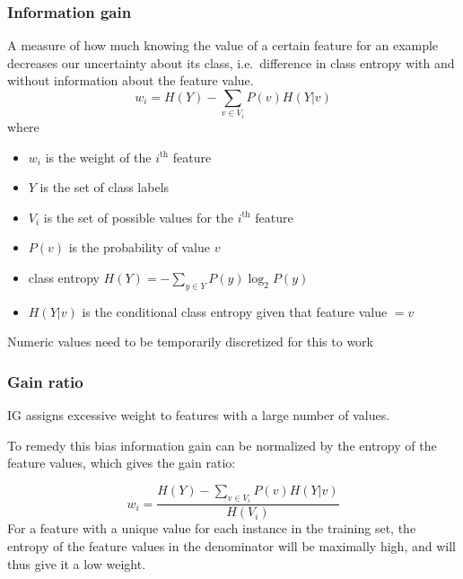 \documentclass{beamer}
\begin{document}
\begin{frame}
 \frametitle{Information gain}
\begin{block}{}
  A measure of how much knowing the value of a certain feature for an
  example decreases our uncertainty about its class, i.e.\ difference
  in class entropy with and without information about the feature
  value.
\begin{equation}
 w_i = H(Y)-\sum_{v \in V_i}P(v)H(Y|v)
\end{equation}
where 
\begin{itemize}
 \item $w_i$ is the weight of the $i^{\text{th}}$ feature
\item $Y$ is the set of class labels
\item $V_i$ is the set of possible values for the $i^{\text{th}}$ feature
\item $P(v)$ is the probability of value $v$
\item class entropy $H(Y) = - \sum_{y \in Y} P(y)\log_2 P(y)$
\item $H(Y|v)$ is the conditional class entropy given that feature
  value $=v$
\end{itemize}
\scriptsize{Numeric values need to be temporarily discretized for this
  to work}
\end{block}
\end{frame}

\begin{frame}
 \frametitle{Gain ratio}
\begin{block}{}
  IG assigns excessive weight to features with a large number of
  values.

  To remedy this bias information gain can be normalized by the
  entropy of the feature values, which gives the gain ratio:

\begin{equation}
 w_i = \frac{H(Y)-\sum_{v \in V_i}P(v)H(Y|v)}
            {H(V_i)}
\end{equation}
For a feature with a unique value for each instance in the training
set, the entropy of the feature values in the denominator will be
maximally high, and will thus give it a low weight.
\end{block}
\end{frame}
\end{document}

